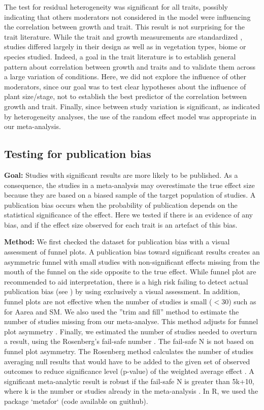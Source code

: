 \documentclass[a4paper,11pt]{article}
\begin{document}
\begin{appendices}
The test for residual heterogeneity was significant for all traits, possibly indicating that others moderators not considered in the model were influencing the correlation between growth and trait. This result is not surprising for the trait literature. While the trait and growth measurements are standardized \citep{Cornelissen:2003gw}, studies differed largely in their design as well as in vegetation types, biome or species studied. Indeed, a goal in the trait literature is to establish general pattern about correlation between growth and traits and to validate them across a large variation of conditions. Here, we did not explore the influence of other moderators, since our goal was to test clear hypotheses about the influence of plant size/stage, not to establish the best predictor of the correlation between growth and trait. Finally, since between study variation is significant, as indicated by heterogeneity analyses, the use of the random effect model was appropriate in our meta-analysis.

\subsection{Testing for publication bias}
\textbf{Goal:} Studies with significant results are more likely to be published. As a consequence, the studies in a meta-analysis may overestimate the true effect size because they are based on a biased sample of the target population of studies. A publication bias occurs when the probability of publication depends on the statistical significance of the effect. Here we tested if there is an evidence of any bias, and if the effect size observed for each trait is an artefact of this bias.

\textbf{Method:} We first checked the dataset for publication bias with a visual assessment of funnel plots. A publication bias toward significant results creates an asymmetric funnel with small studies with non-significant effects missing from the mouth of the funnel on the side opposite to the true effect. While funnel plot are recommended to aid interpretation, there is a high risk failing to detect actual publication bias (see \citealt{Koricheva:2013tz}) by using exclusively a visual assessment. In addition, funnel plots are not effective when the number of studies is small ($<30$) such as for Aarea and SM.
We also used the ''trim and fill'' method to estimate the number of studies missing from our meta-analyse. This method adjusts for funnel plot asymmetry \citep{Duval:2000dg}.
Finally, we estimated the number of studies needed to overturn a result, using the Rosenberg’s fail-safe number \citep{Rosenberg:2005hk}. The fail-safe N is not based on funnel plot asymmetry. The Rosenberg method calculates the number of studies averaging null results that would have to be added to the given set of observed outcomes to reduce significance level (p-value) of the weighted average effect \citep{Rosenberg:2005hk}. A significant meta-analytic result is robust if the fail-safe N is greater than 5k+10, where k is the number or studies already in the meta-analysis \citep{Rosenthal:1979do}.
In R, we used the package `metafor` (code available on guithub).


\end{appendices}
\end{document}
